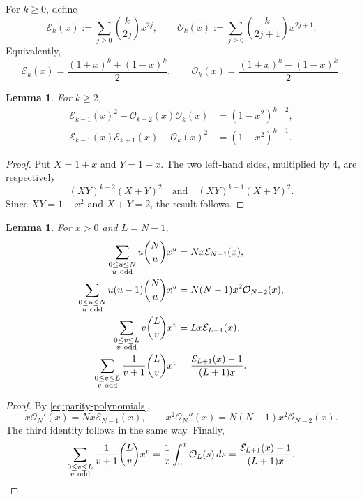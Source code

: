 \documentclass[12pt]{amsart}
\theoremstyle{plain}
\newtheorem{lemma}[theorem]{Lemma}
\theoremstyle{definition}
\theoremstyle{remark}
\begin{document}
For \(k\ge0\), define
\begin{equation}\label{eq:parity-polynomials}
 \mathcal E_k(x):=\sum_{j\ge0}\binom{k}{2j}x^{2j},
 \qquad
 \mathcal O_k(x):=\sum_{j\ge0}\binom{k}{2j+1}x^{2j+1}.
\end{equation}
Equivalently,
\[
 \mathcal E_k(x)
 =\frac{(1+x)^k+(1-x)^k}{2},
 \qquad
 \mathcal O_k(x)
 =\frac{(1+x)^k-(1-x)^k}{2}.
\]

\begin{lemma}\label{lem:parity-identities}
For \(k\ge2\),
\begin{align}
 \mathcal E_{k-1}(x)^2
 -\mathcal O_{k-2}(x)\mathcal O_k(x)
 &=(1-x^2)^{k-2},\label{eq:parity-first}\\
 \mathcal E_{k-1}(x)\mathcal E_{k+1}(x)
 -\mathcal O_k(x)^2
 &=(1-x^2)^{k-1}.\label{eq:parity-second}
\end{align}
\end{lemma}

\begin{proof}
Put \(X=1+x\) and \(Y=1-x\).  The two left-hand sides, multiplied by
\(4\), are respectively
\[
 (XY)^{k-2}(X+Y)^2
 \quad\text{and}\quad
 (XY)^{k-1}(X+Y)^2.
\]
Since \(XY=1-x^2\) and \(X+Y=2\), the result follows.
\end{proof}

\begin{lemma}\label{lem:reference-sums}
For \(x>0\) and \(L=N-1\),
\begin{align*}
 \sum_{\substack{0\le u\le N\\u\ {\rm odd}}}
 u\binom Nu x^u
 &=Nx\mathcal E_{N-1}(x),\\
 \sum_{\substack{0\le u\le N\\u\ {\rm odd}}}
 u(u-1)\binom Nu x^u
 &=N(N-1)x^2\mathcal O_{N-2}(x),\\
 \sum_{\substack{0\le v\le L\\v\ {\rm odd}}}
 v\binom Lv x^v
 &=Lx\mathcal E_{L-1}(x),\\
 \sum_{\substack{0\le v\le L\\v\ {\rm odd}}}
 \frac1{v+1}\binom Lv x^v
 &=\frac{\mathcal E_{L+1}(x)-1}{(L+1)x}.
\end{align*}
\end{lemma}

\begin{proof}
By \eqref{eq:parity-polynomials},
\[
 x\mathcal O_N'(x)=Nx\mathcal E_{N-1}(x),
 \qquad
 x^2\mathcal O_N''(x)
 =N(N-1)x^2\mathcal O_{N-2}(x).
\]
The third identity follows in the same way.  Finally,
\[
 \sum_{\substack{0\le v\le L\\v\ {\rm odd}}}
 \frac1{v+1}\binom Lv x^v
 =
 \frac1x\int_0^x\mathcal O_L(s)\,ds
 =
 \frac{\mathcal E_{L+1}(x)-1}{(L+1)x}.
\]
\end{proof}
\end{document}
